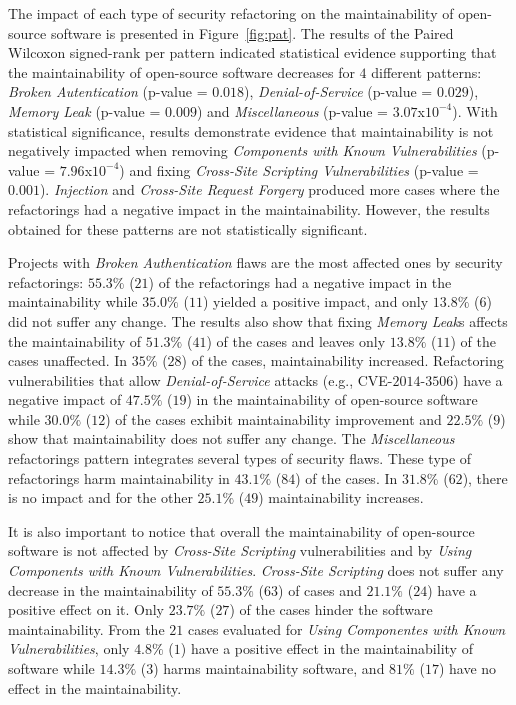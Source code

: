 \documentclass[10pt,conference]{IEEEtran}
\begin{document}
The impact of each type of security refactoring on the maintainability of
open-source software is presented in Figure~\ref{fig:pat}. The results of the
Paired Wilcoxon signed-rank per pattern indicated statistical
evidence supporting that the maintainability of open-source software decreases
for $4$ different patterns: \emph{Broken Autentication} (p-value = $0.018$),
\emph{Denial-of-Service} (p-value = $0.029$), \emph{Memory Leak} (p-value = $0.009$) and
\emph{Miscellaneous} (p-value = $3.07$x$10^{-4}$). With statistical
significance, results demonstrate evidence that maintainability is not
negatively impacted when removing \emph{Components with Known Vulnerabilities}
(p-value = $7.96$x$10^{-4}$) and fixing \emph{Cross-Site Scripting
Vulnerabilities} (p-value = $0.001$). \emph{Injection} and \emph{Cross-Site
Request Forgery} produced more cases where the refactorings had a negative
impact in the maintainability. However, the results obtained for these patterns
are not statistically significant.

Projects with \emph{Broken Authentication} flaws are the most affected ones by
security refactorings: $55.3\%$ ($21$) of the refactorings had a negative impact
in the maintainability while $35.0\%$ ($11$) yielded a positive impact, and only
$13.8\%$ ($6$) did not suffer any change. The results also show that fixing
\emph{Memory Leak}s affects the maintainability of $51.3\%$ ($41$) of the cases
and leaves only $13.8\%$ ($11$) of the cases unaffected. In $35\%$ ($28$) of the
cases, maintainability increased. Refactoring vulnerabilities that allow
\emph{Denial-of-Service} attacks (e.g., CVE-$2014$-$3506$) have a negative
impact of $47.5\%$ ($19$) in the maintainability of open-source software while
$30.0\%$ ($12$) of the cases exhibit maintainability improvement and $22.5\%$
($9$) show that maintainability does not suffer any change. The
\emph{Miscellaneous} refactorings pattern integrates several types of security
flaws. These type of refactorings harm maintainability in $43.1\%$ ($84$) of the
cases. In $31.8\%$ ($62$), there is no impact and for the
other $25.1\%$ ($49$) maintainability increases.

It is also important to notice that overall the maintainability of open-source
software is not affected by \emph{Cross-Site Scripting} vulnerabilities and by
\emph{Using Components with Known Vulnerabilities}. \emph{Cross-Site Scripting}
does not suffer any decrease in the maintainability of $55.3\%$ ($63$) of cases
and $21.1\%$ ($24$) have a positive effect on it. Only $23.7\%$ ($27$) of the
cases hinder the software maintainability. From the $21$ cases evaluated for
\emph{Using Componentes with Known Vulnerabilities}, only $4.8\%$ ($1$) have a
positive effect in the maintainability of software while $14.3\%$ ($3$) harms
maintainability software, and $81\%$ ($17$) have no effect in the
maintainability.
\end{document}
